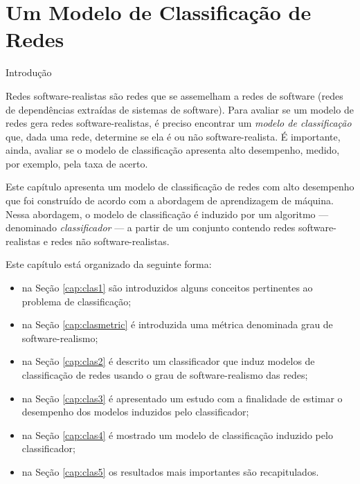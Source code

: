 \chapter{Um Modelo de Classificação de Redes} \label{cap:classificacao}


\begin{section}{Introdução}
	
	
	Redes software-realistas são redes que se assemelham a redes de software (redes de dependências extraídas de sistemas de software). Para avaliar se um modelo de redes gera redes software-realistas, é preciso encontrar um \emph{modelo de classificação} que, dada uma rede, determine se ela é ou não software-realista. É importante, ainda, avaliar se o modelo de classificação apresenta alto desempenho, medido, por exemplo, pela taxa de acerto.
	
	Este capítulo apresenta um modelo de classificação de redes com alto desempenho que foi construído de acordo com a abordagem de aprendizagem de máquina. Nessa abordagem, o modelo de classificação é induzido por um algoritmo --- denominado \emph{classificador} --- a partir de um conjunto contendo redes software-realistas e redes não software-realistas.
	
	Este capítulo está organizado da seguinte forma:
	
	\begin{itemize}
		\item na Seção \ref{cap:clas1} são introduzidos alguns conceitos pertinentes ao problema de classificação;
		\item na Seção \ref{cap:clasmetric} é introduzida uma métrica denominada grau de software-realismo;
		\item na Seção \ref{cap:clas2} é descrito um classificador que induz modelos de classificação de redes usando o grau de software-realismo das redes; %
		\item na Seção \ref{cap:clas3} é apresentado um estudo com a finalidade de estimar o desempenho dos modelos induzidos pelo classificador;
		\item na Seção \ref{cap:clas4} é mostrado um modelo de classificação induzido pelo classificador;
		\item na Seção \ref{cap:clas5} os resultados mais importantes são recapitulados.
	\end{itemize}	
	

\end{section}
